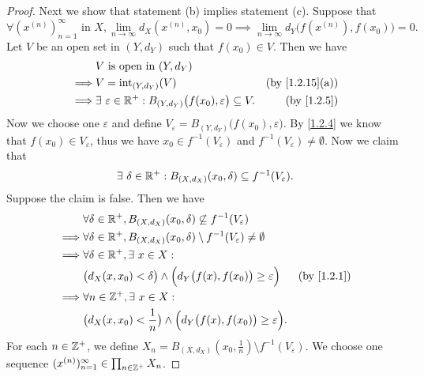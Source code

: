 \begin{proof}
  Next we show that statement (b) implies statement (c).
  Suppose that
  \[
    \forall (x^{(n)})_{n = 1}^\infty \text{ in } X, \lim_{n \to \infty} d_X(x^{(n)}, x_0) = 0 \implies \lim_{n \to \infty} d_Y\big(f(x^{(n)}), f(x_0)\big) = 0.
  \]
  Let \(V\) be an open set in \((Y, d_Y)\) such that \(f(x_0) \in V\).
  Then we have
  \begin{align*}
             & V \text{ is open in } (Y, d_Y)                                                                                        \\
    \implies & V = \text{int}_{(Y, d_Y)}(V)                                                           & \text{(by \cref{1.2.15}(a))} \\
    \implies & \exists\ \varepsilon \in \R^+ : B_{(Y, d_Y)}\big(f(x_0), \varepsilon\big) \subseteq V. & \text{(by \cref{1.2.5})}
  \end{align*}
  Now we choose one \(\varepsilon\) and define \(V_\varepsilon = B_{(Y, d_Y)}\big(f(x_0), \varepsilon\big)\).
  By \cref{1.2.4} we know that \(f(x_0) \in V_\varepsilon\), thus we have \(x_0 \in f^{-1}(V_\varepsilon)\) and \(f^{-1}(V_\varepsilon) \neq \emptyset\).
  Now we claim that
  \[
    \exists\ \delta \in \mathbb{R}^+ : B_{(X, d_X)}(x_0, \delta) \subseteq f^{-1}(V_\varepsilon).
  \]
  Suppose the claim is false.
  Then we have
  \begin{align*}
             & \forall \delta \in \R^+, B_{(X, d_X)}(x_0, \delta) \not\subseteq f^{-1}(V_\varepsilon)                                       \\
    \implies & \forall \delta \in \R^+, B_{(X, d_X)}(x_0, \delta) \setminus f^{-1}(V_\varepsilon) \neq \emptyset                            \\
    \implies & \forall \delta \in \R^+, \exists\ x \in X :                                                                                  \\
             & \big(d_X(x, x_0) < \delta\big) \land \Big(d_Y\big(f(x), f(x_0)\big) \geq \varepsilon\Big)         & \text{(by \cref{1.2.1})} \\
    \implies & \forall n \in \Z^+, \exists\ x \in X :                                                                                       \\
             & \big(d_X(x, x_0) < \frac{1}{n}\big) \land \Big(d_Y\big(f(x), f(x_0)\big) \geq \varepsilon\Big).
  \end{align*}
  For each \(n \in \mathbb{Z}^+\), we define \(X_n = B_{(X, d_X)}(x_0, \frac{1}{n}) \setminus f^{-1}(V_\varepsilon)\).
  We choose one sequence \((x^{(n)})_{n = 1}^\infty \in \prod_{n \in \mathbb{Z}^+} X_n\).

\end{proof}
